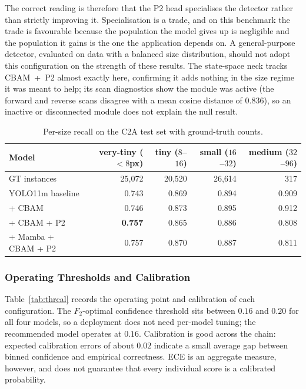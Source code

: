The correct reading is therefore that the P2 head specialises the detector
rather than strictly improving it. Specialisation is a trade, and on this
benchmark the trade is favourable because the population the model gives up is
negligible and the population it gains is the one the application depends on. A
general-purpose detector, evaluated on data with a balanced size distribution,
should not adopt this configuration on the strength of these results. The state-space neck tracks CBAM~+~P2 almost exactly
here, confirming it adds nothing in the size regime it was meant to help; its
scan diagnostics show the module was active (the forward and reverse scans
disagree with a mean cosine distance of $0.836$), so an inactive or disconnected
module does not explain the null result.

\begin{table}[tbp]
  \centering
  \caption{Per-size recall on the C2A test set with ground-truth counts.}
  \label{tab:persize}
  \begin{tabular}{|l|r|r|r|r|}
    \hline
    Model & \makecell{very-tiny\\($<8$px)} & \makecell{tiny\\($8$--$16$)} & \makecell{small\\($16$--$32$)} & \makecell{medium\\($32$--$96$)} \\ \hline
    GT instances & 25{,}072 & 20{,}520 & 26{,}614 & 317 \\
    \hline
    YOLO11m baseline    & 0.743 & 0.869 & 0.894 & 0.909 \\ \hline
    + CBAM              & 0.746 & 0.873 & 0.895 & 0.912 \\ \hline
    + CBAM + P2         & \textbf{0.757} & 0.865 & 0.886 & 0.808 \\ \hline
    + Mamba + CBAM + P2 & 0.757 & 0.870 & 0.887 & 0.811 \\
    \hline
  \end{tabular}
\end{table}

\subsubsection{Operating Thresholds and Calibration}
Table~\ref{tab:thrcal} records the operating point and calibration of each
configuration. The $F_2$-optimal confidence threshold sits between $0.16$ and
$0.20$ for all four models, so a deployment does not need per-model tuning;
the recommended model operates at $0.16$. Calibration is good across the
chain: expected calibration errors of about $0.02$ indicate a small average
gap between binned confidence and empirical correctness. ECE is an aggregate
measure, however, and does not guarantee that every individual score is a
calibrated probability.


